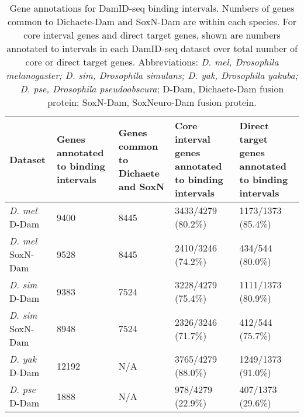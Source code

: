 \begin{table}[h]
\centering
\begin{tabular}{|l|p{2cm}|p{2cm}|p{2.5cm}|p{2.5cm}|}
\hline
\textbf{Dataset}         & \textbf{Genes annotated to binding intervals} & \textbf{Genes common to Dichaete and SoxN} & \textbf{Core interval genes annotated to binding intervals} & \textbf{Direct target genes annotated to binding intervals} \\ \hline
\emph{D. mel} D-Dam    & 9400                                 & 8445                              & 3433/4279 (80.2\%)                                 & 1173/1373 (85.4\%)                                 \\ \hline
\emph{D. mel} SoxN-Dam & 9528                                 & 8445                              & 2410/3246 (74.2\%)                                 & 434/544 (80.0\%)                                   \\ \hline
\emph{D. sim} D-Dam    & 9383                                 & 7524                              & 3228/4279 (75.4\%)                                 & 1111/1373 (80.9\%)                                 \\ \hline
\emph{D. sim} SoxN-Dam & 8948                                 & 7524                              & 2326/3246 (71.7\%)                                 & 412/544 (75.7\%)                                   \\ \hline
\emph{D. yak} D-Dam    & 12192                                & N/A                               & 3765/4279 (88.0\%)                                 & 1249/1373 (91.0\%)                                 \\ \hline
\emph{D. pse} D-Dam    & 1888                                 & N/A                               & 978/4279 (22.9\%)                                  & 407/1373 (29.6\%)                                  \\ \hline
\end{tabular}
\caption{Gene annotations for DamID-seq binding intervals. Numbers of genes common to Dichaete-Dam and SoxN-Dam are within each species. For core interval genes and direct target genes, shown are numbers annotated to intervals in each DamID-seq dataset over total number of core or direct target genes. Abbreviations: \emph{D. mel, Drosophila melanogaster; D. sim, Drosophila simulans; D. yak, Drosophila yakuba; D. pse, Drosophila pseudoobscura}; D-Dam, Dichaete-Dam fusion protein; SoxN-Dam, SoxNeuro-Dam fusion protein.}
\label{Table 4.8}
\end{table}

